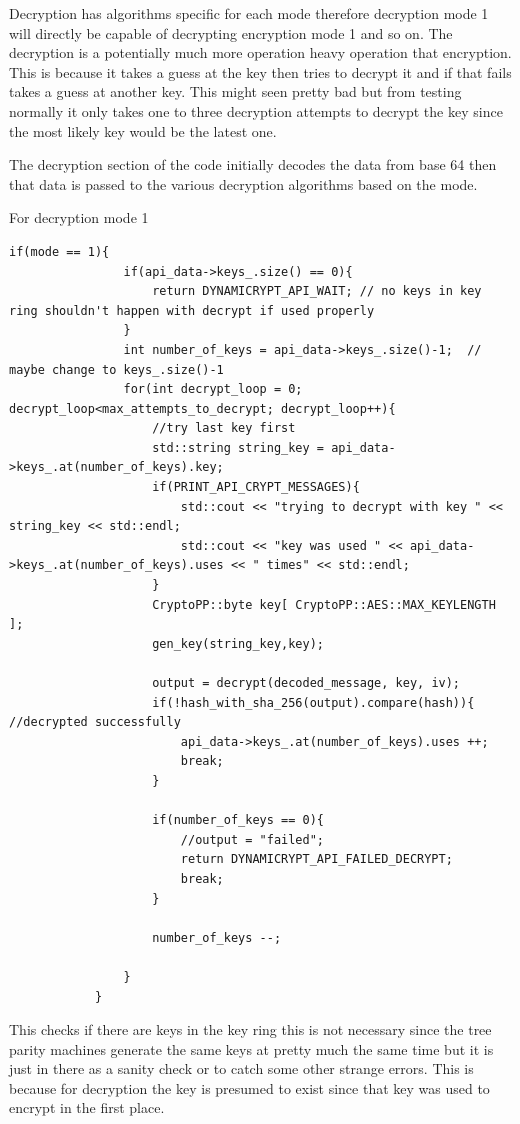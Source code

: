 Decryption has algorithms specific for each mode therefore decryption mode 1 will directly be capable of decrypting encryption mode 1 and so on. The decryption is a potentially much more operation heavy operation that encryption. This is because it takes a guess at the key then tries to decrypt it and if that fails takes a guess at another key. This might seen pretty bad but from testing normally it only takes one to three decryption attempts to decrypt the key since the most likely key would be the latest one.

The decryption section of the code initially decodes the data from base 64 then that data is passed to the various decryption algorithms based on the mode.

For decryption mode 1
\begin{lstlisting}
if(mode == 1){
                if(api_data->keys_.size() == 0){
                    return DYNAMICRYPT_API_WAIT; // no keys in key ring shouldn't happen with decrypt if used properly
                }
                int number_of_keys = api_data->keys_.size()-1;  // maybe change to keys_.size()-1
                for(int decrypt_loop = 0; decrypt_loop<max_attempts_to_decrypt; decrypt_loop++){
                    //try last key first
                    std::string string_key = api_data->keys_.at(number_of_keys).key;
                    if(PRINT_API_CRYPT_MESSAGES){
                        std::cout << "trying to decrypt with key " << string_key << std::endl;
                        std::cout << "key was used " << api_data->keys_.at(number_of_keys).uses << " times" << std::endl;
                    }
                    CryptoPP::byte key[ CryptoPP::AES::MAX_KEYLENGTH ];
                    gen_key(string_key,key);

                    output = decrypt(decoded_message, key, iv);
                    if(!hash_with_sha_256(output).compare(hash)){ //decrypted successfully
                        api_data->keys_.at(number_of_keys).uses ++;
                        break;
                    }

                    if(number_of_keys == 0){
                        //output = "failed";
                        return DYNAMICRYPT_API_FAILED_DECRYPT;
                        break;
                    }

                    number_of_keys --;
                
                }
            }
\end{lstlisting} 
This checks if there are keys in the key ring this is not necessary since the tree parity machines generate the same keys at pretty much the same time but it is just in there as a sanity check or to catch some other strange errors. This is because for decryption the key is presumed to exist since that key was used to encrypt in the first place.

